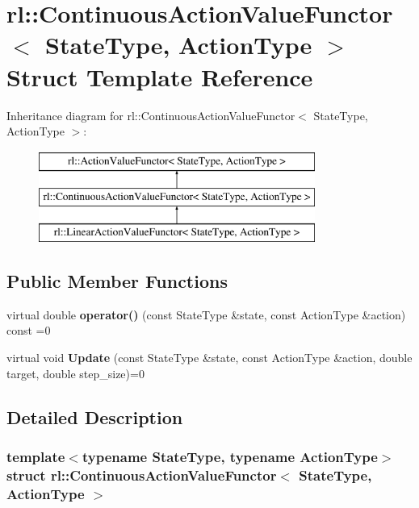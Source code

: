 \hypertarget{structrl_1_1_continuous_action_value_functor}{}\section{rl\+:\+:Continuous\+Action\+Value\+Functor$<$ State\+Type, Action\+Type $>$ Struct Template Reference}
\label{structrl_1_1_continuous_action_value_functor}
Inheritance diagram for rl\+:\+:Continuous\+Action\+Value\+Functor$<$ State\+Type, Action\+Type $>$\+:\begin{figure}[H]
\begin{center}
\leavevmode
\includegraphics[height=3.000000cm]{structrl_1_1_continuous_action_value_functor}
\end{center}
\end{figure}
\subsection*{Public Member Functions}
\begin{DoxyCompactItemize}
\item 
\hypertarget{structrl_1_1_continuous_action_value_functor_a26a7003e2724547484edb8e16c14cea5}{}\label{structrl_1_1_continuous_action_value_functor_a26a7003e2724547484edb8e16c14cea5} 
virtual double {\bfseries operator()} (const State\+Type \&state, const Action\+Type \&action) const =0
\item 
\hypertarget{structrl_1_1_continuous_action_value_functor_af22ee932e1a965c82c73de8574f82254}{}\label{structrl_1_1_continuous_action_value_functor_af22ee932e1a965c82c73de8574f82254} 
virtual void {\bfseries Update} (const State\+Type \&state, const Action\+Type \&action, double target, double step\+\_\+size)=0
\end{DoxyCompactItemize}


\subsection{Detailed Description}
\subsubsection*{template$<$typename State\+Type, typename Action\+Type$>$\newline
struct rl\+::\+Continuous\+Action\+Value\+Functor$<$ State\+Type, Action\+Type $>$}



